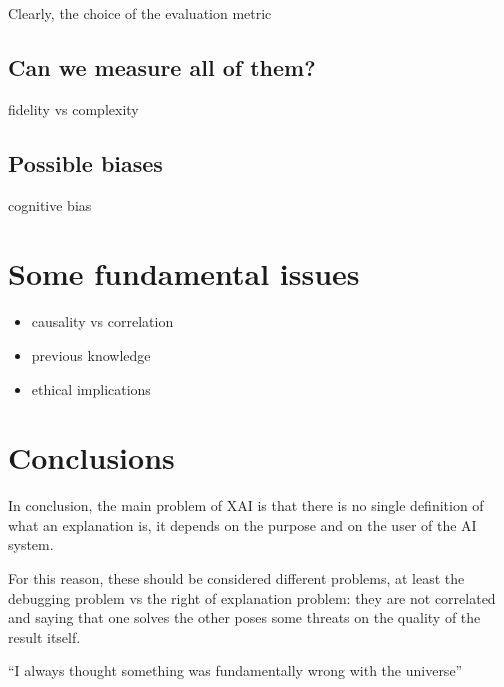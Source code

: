 \documentclass[conference]{IEEEtran}
\begin{document}
Clearly, the choice of the evaluation metric

\subsection{Can we measure all of them?}

fidelity vs complexity

\subsection{Possible biases}

cognitive bias

\section{Some fundamental issues}
\label{sec:missing}


\begin{itemize}
    \item causality vs correlation
    \item previous knowledge
    \item ethical implications
\end{itemize}

\section{Conclusions}
\label{sec:conclusions}

In conclusion, the main problem of XAI is that there is no single definition of
what an explanation is, it depends on the purpose and on the user of the AI
system.

For this reason, these should be considered different problems, at least the
debugging problem vs the right of explanation problem: they are not correlated
and saying that one solves the other poses some threats on the quality of the
result itself.

``I always thought something was fundamentally wrong with the universe''

\citep{adams1995hitchhiker}



\end{document}
